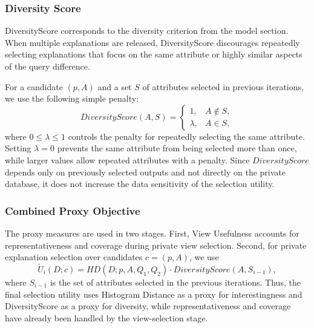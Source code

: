 \subsubsection{Diversity Score}
\label{subsubsec:diversity-score}

DiversityScore corresponds to the diversity criterion from the model section.
When multiple explanations are released, DiversityScore discourages repeatedly selecting explanations that focus on the same attribute or highly similar aspects of the query difference.

For a candidate $(p,A)$ and a set $S$ of attributes selected in previous iterations, we use the following simple penalty:
\begin{equation}
DiversityScore(A,S)
=
\begin{cases}
1, & A \notin S,\\
\lambda, & A \in S,
\end{cases}
\label{eq:diversity-score}
\end{equation}
where $0\leq \lambda \leq 1$ controls the penalty for repeatedly selecting the same attribute.
Setting $\lambda=0$ prevents the same attribute from being selected more than once, while larger values allow repeated attributes with a penalty.
Since $DiversityScore$ depends only on previously selected outputs and not directly on the private database, it does not increase the data sensitivity of the selection utility.

\subsubsection{Combined Proxy Objective}
\label{subsubsec:combined-proxy-objective}

The proxy measures are used in two stages.
First, View Usefulness accounts for representativeness and coverage during private view selection.
Second, for private explanation selection over candidates $c=(p,A)$, we use
\begin{equation}
\widetilde{U}_i(D;c)
=
HD(D;p,A,Q_1,Q_2) \cdot DiversityScore(A,S_{i-1}),
\label{eq:selection-utility}
\end{equation}
where $S_{i-1}$ is the set of attributes selected in the previous iterations.
Thus, the final selection utility uses Histogram Distance as a proxy for interestingness and DiversityScore as a proxy for diversity, while representativeness and coverage have already been handled by the view-selection stage.

